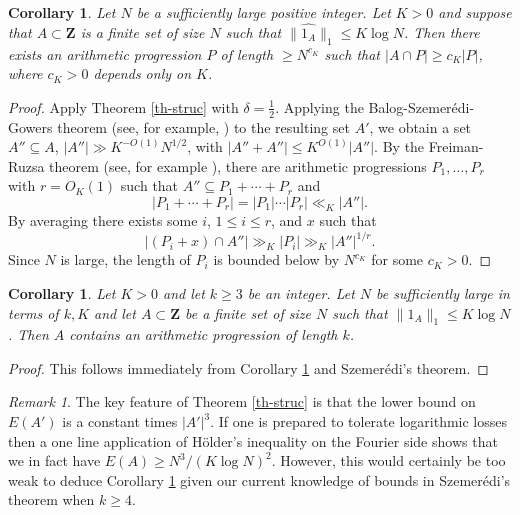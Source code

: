\documentclass[reqno]{amsart}
\newcommand{\anorm}[1]{\| \widehat{#1}\|}
\renewcommand{\leq}{\leqslant}
\renewcommand{\geq}{\geqslant}
\newcommand{\ind}[1]{1_{#1}}
\newcommand{\bbz}{\mathbf{Z}}
\newcommand{\abs}[1]{\left\lvert #1\right\rvert}
\numberwithin{equation}{section}
\newtheorem{corollary}[theorem]{Corollary}
\theoremstyle{definition}
\theoremstyle{remark}
\newtheorem*{remark}{Remark}
\begin{document}
\begin{corollary} \label{cor1}Let $N$ be a sufficiently large positive integer. Let $K > 0$ and suppose that $A\subset \bbz$ is a finite set of size $N$ such that $\anorm{\ind{A}}_1\leq K\log N$. Then there exists an arithmetic progression $P$ of length $\geq N^{c_K}$ such that $\abs{A\cap P}\geq c_K \abs{P}$, where $c_K > 0$ depends only on $K$.
\end{corollary}
\begin{proof} Apply Theorem \ref{th-struc} with $\delta = \frac{1}{2}$. Applying the Balog-Szemer\'{e}di-Gowers theorem (see, for example, \cite[Theorem 2.31]{TaVu06}) to the resulting set $A'$, we obtain a set $A'' \subseteq A$, $|A''| \gg K^{-O(1)} N^{1/2}$, with  $\abs{A''+A''}\leq K^{O(1)} \lvert A''\rvert$. By the Freiman-Ruzsa theorem (see, for example \cite[Theorem 5.33]{TaVu06}), there are arithmetic progressions $P_1,\ldots,P_r$ with $r = O_K(1)$ such that $A'' \subseteq P_1+\cdots+P_r$ and
\[\abs{P_1+\cdots+P_r}=\abs{P_1}\cdots\abs{P_r}\ll_K \abs{A''}.\]
By averaging there exists some $i$, $1\leq i\leq r$, and $x$ such that 
\[\abs{(P_i+x)\cap A''}\gg_K \abs{P_i}\gg_K \abs{A''}^{1/r}.\]
Since $N$ is large, the length of $P_i$ is bounded below by $N^{c_K}$ for some $c_K > 0$.
\end{proof}


\begin{corollary}\label{cor2}
Let $K>0$ and let $k \geq 3$ be an integer. Let $N$ be sufficiently large in terms of $k,K$ and let $A\subset \bbz$ be a finite set of size $N$ such that $\anorm{\ind{A}}_1\leq K\log N$. Then $A$ contains an arithmetic progression of length $k$.
\end{corollary}
\begin{proof}
This follows immediately from Corollary \ref{cor1} and Szemer\'edi's theorem.     
\end{proof}

\begin{remark}
The key feature of Theorem \ref{th-struc} is that the lower bound on $E(A')$ is a constant times $|A'|^3$. If one is prepared to tolerate logarithmic losses then a one line application of H\"older's inequality on the Fourier side shows that we in fact have $E(A) \geq N^3/(K\log N)^2$. However, this would certainly be too weak to deduce Corollary \ref{cor2} given our current knowledge of bounds in Szemer\'edi's theorem when $k \geq 4$.
\end{remark}
\end{document}
